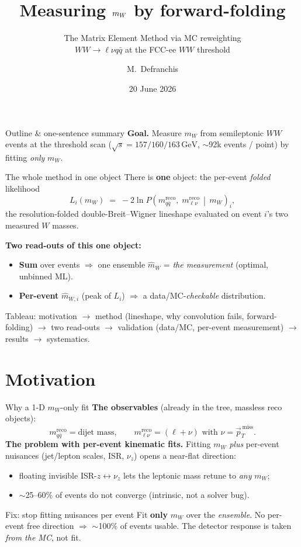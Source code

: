 \documentclass[aspectratio=169,10pt]{beamer}
\title[$\mw$ by forward-folding]{Measuring $\mw$ by forward-folding}
\subtitle{The Matrix Element Method via MC reweighting \\ $WW\to\ell\nu q\bar q$ at the FCC-ee $WW$ threshold}
\author[Defranchis]{M.\ Defranchis}
\institute[CERN]{CERN}
\date{20 June 2026}
\newcommand{\mw}{m_W}
\newcommand{\mwhat}{\hat m_W}
\newcommand{\mwhati}{\hat m_{W,i}}
\newcommand{\mqq}{m_{q\bar q}}
\newcommand{\mlv}{m_{\ell\nu}}
\newcommand{\reco}{^{\mathrm{reco}}}
\newcommand{\GeV}{\,\mathrm{GeV}}
\begin{document}
{\begin{frame}\titlepage\end{frame}}

\begin{frame}{Outline \& one-sentence summary}
\textbf{Goal.} Measure $\mw$ from semileptonic $WW$ events at the threshold scan
($\sqrt{s}=157/160/163\GeV$, $\sim$92k events / point) by fitting \emph{only} $\mw$.
\vfill
\begin{block}{The whole method in one object}
There is \textbf{one} object: the per-event \emph{folded} likelihood
\[
  L_i(\mw)\;=\;-2\ln P\!\left(\mqq\reco,\;\mlv\reco \,\middle|\, \mw\right)_{\!i},
\]
the resolution-folded double-Breit--Wigner lineshape evaluated on event $i$'s two measured $W$ masses.
\end{block}
\vfill
\textbf{Two read-outs of this one object:}
\begin{itemize}
  \item[(A)] \textbf{Sum} over events $\Rightarrow$ one ensemble $\mwhat$ = \emph{the measurement} (optimal, unbinned ML).
  \item[(B)] \textbf{Per-event} $\mwhati$ (peak of $L_i$) $\Rightarrow$ a data/MC-\emph{checkable} distribution.
\end{itemize}
\vfill
\footnotesize Tableau: motivation $\to$ method (lineshape, why convolution fails, forward-folding)
$\to$ two read-outs $\to$ validation (data/MC, per-event measurement) $\to$ results $\to$ systematics.
\end{frame}

\section{Motivation}
\begin{frame}{Why a 1-D $\mw$-only fit}
\textbf{The observables} (already in the tree, massless reco objects):
\[
  \mqq\reco=\text{dijet mass},\qquad \mlv\reco=(\ell+\nu)\text{ with }\nu=\vec p_T^{\,\mathrm{miss}}.
\]
\vfill
\textbf{The problem with per-event kinematic fits.} Fitting $\mw$ \emph{plus} per-event nuisances
(jet/lepton scales, ISR, $\nu_z$) opens a near-flat direction:
\begin{itemize}
  \item floating invisible ISR-$z\leftrightarrow\nu_z$ lets the leptonic mass retune to \emph{any} $\mw$;
  \item $\sim$25--60\% of events do not converge (intrinsic, not a solver bug).
\end{itemize}
\vfill
\begin{block}{Fix: stop fitting nuisances per event}
Fit \textbf{only} $\mw$ over the \emph{ensemble}. No per-event free direction $\Rightarrow$
$\sim$100\% of events usable. The detector response is taken \emph{from the MC}, not fit.
\end{block}
\end{frame}
\end{document}
